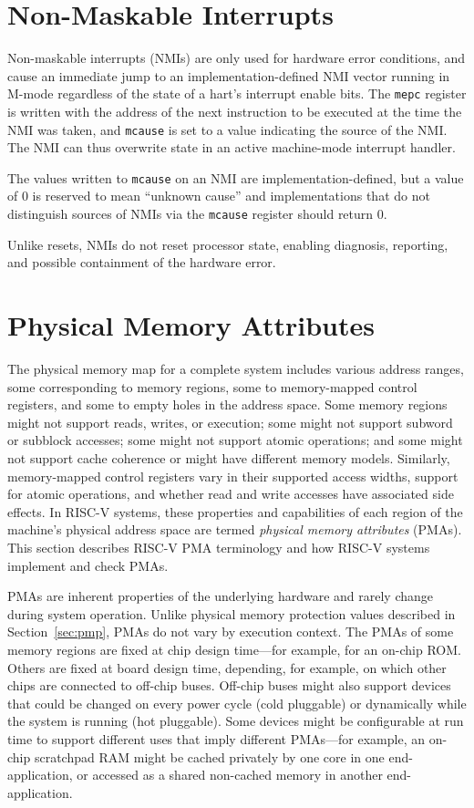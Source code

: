 \section{Non-Maskable Interrupts}
\label{sec:nmi}

Non-maskable interrupts (NMIs) are only used for hardware error
conditions, and cause an immediate jump to an implementation-defined
NMI vector running in M-mode regardless of the state of a hart's
interrupt enable bits.  The {\tt mepc} register is written with the
address of the next instruction to be executed at the time the NMI was
taken, and {\tt mcause} is set to a value indicating the source of the
NMI.  The NMI can thus overwrite state in an active machine-mode
interrupt handler.

The values written to {\tt mcause} on an NMI are
implementation-defined, but a value of 0 is reserved to mean ``unknown
cause'' and implementations that do not distinguish sources of NMIs
via the {\tt mcause} register should return 0.

Unlike resets, NMIs do not reset processor state, enabling diagnosis,
reporting, and possible containment of the hardware error.

\section{Physical Memory Attributes}
\label{sec:pma}

The physical memory map for a complete system includes various address
ranges, some corresponding to memory regions, some to memory-mapped
control registers, and some to empty holes in the address space.  Some
memory regions might not support reads, writes, or execution; some
might not support subword or subblock accesses; some might not support
atomic operations; and some might not support cache coherence or might
have different memory models.  Similarly, memory-mapped control
registers vary in their supported access widths, support for atomic
operations, and whether read and write accesses have associated side
effects.  In RISC-V systems, these properties and capabilities of each
region of the machine's physical address space are termed {\em
  physical memory attributes} (PMAs).  This section describes RISC-V
PMA terminology and how RISC-V systems implement and check PMAs.

PMAs are inherent properties of the underlying hardware and rarely
change during system operation.  Unlike physical memory protection
values described in Section~\ref{sec:pmp}, PMAs do not vary by
execution context.  The PMAs of some memory regions are fixed at chip
design time---for example, for an on-chip ROM.  Others are fixed at
board design time, depending, for example, on which other chips are
connected to off-chip buses.  Off-chip buses might also support
devices that could be changed on every power cycle (cold pluggable) or
dynamically while the system is running (hot pluggable).  Some devices
might be configurable at run time to support different uses that imply
different PMAs---for example, an on-chip scratchpad RAM might be
cached privately by one core in one end-application, or accessed as a
shared non-cached memory in another end-application.

